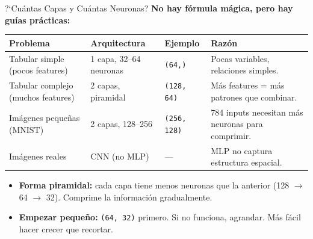 \documentclass[aspectratio=169, 11pt]{beamer}
\begin{document}
\begin{frame}{?`Cu\'antas Capas y Cu\'antas Neuronas?}
  \vspace{-4pt}
  {\footnotesize\color{arcaDark}\bfseries
    No hay f\'ormula m\'agica, pero hay gu\'ias pr\'acticas:}

  \vspace{6pt}
  {\scriptsize
  \begin{tabular}{@{}p{3cm}p{3cm}p{2.5cm}p{3.5cm}@{}}
    \toprule
    \textbf{Problema} & \textbf{Arquitectura} & \textbf{Ejemplo} & \textbf{Raz\'on} \\
    \midrule
    Tabular simple (pocos features) & 1 capa, 32--64 neuronas & \texttt{(64,)} & Pocas variables, relaciones simples. \\
    Tabular complejo (muchos features) & 2 capas, piramidal & \texttt{(128, 64)} & M\'as features = m\'as patrones que combinar. \\
    Im\'agenes peque\~nas (MNIST) & 2 capas, 128--256 & \texttt{(256, 128)} & 784 inputs necesitan m\'as neuronas para comprimir. \\
    Im\'agenes reales & CNN (no MLP) & --- & MLP no captura estructura espacial. \\
    \bottomrule
  \end{tabular}
  }

  \vspace{6pt}
  {\footnotesize
  \begin{itemize}\setlength{\itemsep}{3pt}
    \item[{\color{codeGreen}\scriptsize\faArrowRight}]
      \textbf{Forma piramidal:} cada capa tiene menos neuronas que la anterior
      (128 $\to$ 64 $\to$ 32). Comprime la informaci\'on gradualmente.
    \item[{\color{arcaRed}\scriptsize\faArrowRight}]
      \textbf{Empezar peque\~no:} \texttt{(64, 32)} primero. Si no
      funciona, agrandar. M\'as f\'acil hacer crecer que recortar.
  \end{itemize}
  }
\end{frame}
\end{document}
